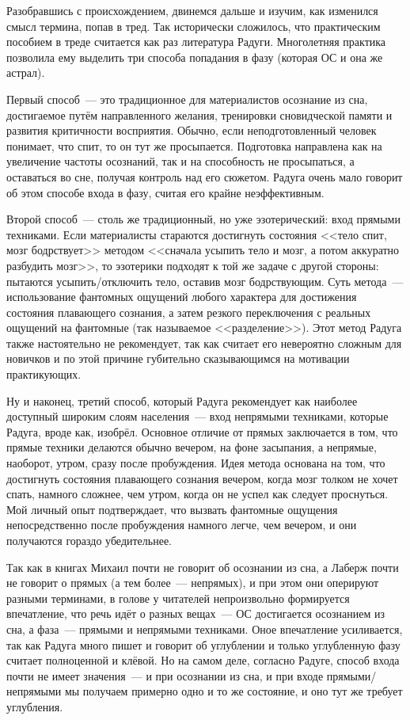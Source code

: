 \documentclass[a4paper,14pt,oneside]{memoir}
\begin{document}
Разобравшись с происхождением, двинемся дальше и изучим, как изменился смысл термина, попав в тред. Так исторически сложилось, что практическим пособием в треде считается как раз литература Радуги. Многолетняя практика позволила ему выделить три способа попадания в фазу (которая ОС и она же астрал).

Первый способ~--- это традиционное для материалистов осознание из сна, достигаемое путём направленного желания, тренировки сновидческой памяти и развития критичности восприятия. Обычно, если неподготовленный человек понимает, что спит, то он тут же просыпается. Подготовка направлена как на увеличение частоты осознаний, так и на способность не просыпаться, а оставаться во сне, получая контроль над его сюжетом. Радуга очень мало говорит об этом способе входа в фазу, считая его крайне неэффективным.

Второй способ~--- столь же традиционный, но уже эзотерический: вход прямыми техниками. Если материалисты стараются достигнуть состояния <<тело спит, мозг бодрствует>> методом <<сначала усыпить тело и мозг, а потом аккуратно разбудить мозг>>, то эзотерики подходят к той же задаче с другой стороны: пытаются усыпить/отключить тело, оставив мозг бодрствующим. Суть метода~--- использование фантомных ощущений любого характера для достижения состояния плавающего сознания, а затем резкого переключения с реальных ощущений на фантомные (так называемое <<разделение>>). Этот метод Радуга также настоятельно не рекомендует, так как считает его невероятно сложным для новичков и по этой причине губительно сказывающимся на мотивации практикующих.

Ну и наконец, третий способ, который Радуга рекомендует как наиболее доступный широким слоям населения~--- вход непрямыми техниками, которые Радуга, вроде как, изобрёл. Основное отличие от прямых заключается в том, что прямые техники делаются обычно вечером, на фоне засыпания, а непрямые, наоборот, утром, сразу после пробуждения. Идея метода основана на том, что достигнуть состояния плавающего сознания вечером, когда мозг толком не хочет спать, намного сложнее, чем утром, когда он не успел как следует проснуться. Мой личный опыт подтверждает, что вызвать фантомные ощущения непосредственно после пробуждения намного легче, чем вечером, и они получаются гораздо убедительнее.

Так как в книгах Михаил почти не говорит об осознании из сна, а Лаберж почти не говорит о прямых (а тем более~--- непрямых), и при этом они оперируют разными терминами, в голове у читателей непроизвольно формируется впечатление, что речь идёт о разных вещах~--- ОС достигается осознанием из сна, а фаза~--- прямыми и непрямыми техниками. Оное впечатление усиливается, так как Радуга много пишет и говорит об углублении и только углубленную фазу считает полноценной и клёвой. Но на самом деле, согласно Радуге, способ входа почти не имеет значения~--- и при осознании из сна, и при входе прямыми/непрямыми мы получаем примерно одно и то же состояние, и оно тут же требует углубления. 
\end{document}
